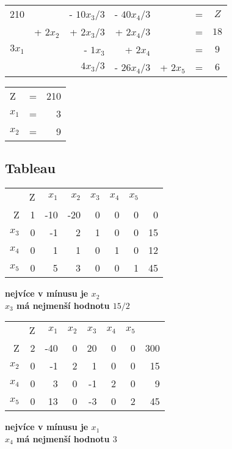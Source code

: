\documentclass{article}%
\begin{document}
\begin{tabular}{rrrrrcc}
      210  &          & - $10x_3/3$ & - $40x_4/3$ &             & = & $Z$   \\
           & + $2x_2$ & + $2x_3/3$  & + $2x_4/3$  &             & = & $18$  \\
    $3x_1$ &          & - $1x_3$    & + $2x_4$    &             & = & $9$  \\
           &          &   $4x_3/3$  & - $26x_4/3$ & + $2x_5$    & = & $6$  \\
\end{tabular}
\newline

\begin{tabular}{lcr}
    Z     & =     & 210 \\
    $x_1$ & =     & 3 \\
    $x_2$ & =     & 9 \\
\end{tabular}

\newpage
\subsection{Tableau}
\begin{tabular}{rrrrrrrr}
            & Z     & $x_1$ & $x_2$ & $x_3$ & $x_4$ & $x_5$ &       \\
     Z      & 1     & -10   & -20   & 0     & 0     & 0     & 0     \\
     $x_3$  & 0     & -1    & 2     & 1     & 0     & 0     & 15    \\
     $x_4$  & 0     & 1     & 1     & 0     & 1     & 0     & 12    \\
     $x_5$  & 0     & 5     & 3     & 0     & 0     & 1     & 45    \\
\end{tabular}
\newline
\textbf{
    nejvíce v mínusu je $x_2$ \\
    $x_3$ má nejmenší hodnotu $15/2$ \\
}

\begin{tabular}{rrr|r|rrrr}
        & Z     & $x_1$ & $x_2$ & $x_3$ & $x_4$ & $x_5$ &       \\
    Z      & 2     & -40   & 0     & 20    & 0     & 0     & 300   \\
    \midrule
    $x_2$  & 0     & -1    & 2     & 1     & 0     & 0     & 15    \\
    \midrule
    $x_4$  & 0     & 3     & 0     & -1    & 2     & 0     & 9     \\
    $x_5$  & 0     & 13    & 0     & -3    & 0     & 2     & 45    \\
\end{tabular}
\newline
\textbf{
    nejvíce v mínusu je $x_1$ \\
    $x_4$ má nejmenší hodnotu $3$ \\
}
\end{document}
